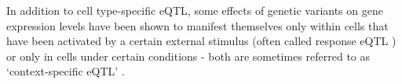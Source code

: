 In addition to cell type-specific eQTL,
some effects of genetic variants on gene expression levels have been shown to manifest themselves only within cells that have been activated by a certain external stimulus (often called response eQTL \cite{fairfax2014innate, barreiro2012deciphering, kim2017genetic}) or only in cells under certain conditions \cite{yao2014sex} - both are sometimes referred to as `context-specific eQTL' \cite{westra2014genome}. 


